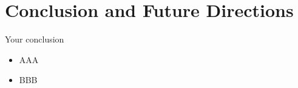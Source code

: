 \documentclass[print,phd]{nuthesis}
\begin{document}
\chapter{Conclusion and Future Directions}
\label{sec:Conclusion_FD}

\par Your conclusion
 
 \begin{itemize}
 \item AAA
    
 \item BBB
\end{itemize}
\backmatter



\end{document}
